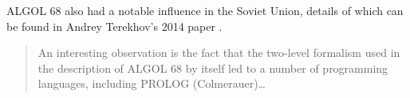 ALGOL 68 also had a notable influence in the Soviet Union, details of which can
be found in Andrey Terekhov's 2014 paper .


\begin{quotation}
	An interesting observation is the fact that the two-level formalism used
	in the description of ALGOL 68 by itself led to a number of programming
	languages, including PROLOG (Colmerauer)\dots
	\cite{a_shorter_history_of_algol68_1994}
\end{quotation}
